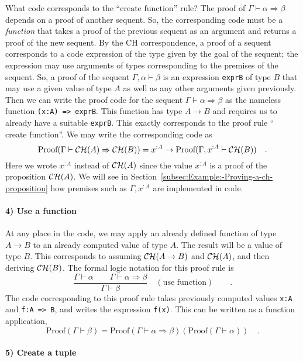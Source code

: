 What code corresponds to the ``$\text{create function}$'' rule?
The proof of $\Gamma\vdash\alpha\Rightarrow\beta$ depends on a proof
of another sequent. So, the corresponding code must be a \emph{function}
that takes a proof of the previous sequent as an argument and returns
a proof of the new sequent. By the CH correspondence, a proof of a
sequent corresponds to a code expression of the type given by the
goal of the sequent; the expression may use arguments of types corresponding
to the premises of the sequent. So, a proof of the sequent $\Gamma,\alpha\vdash\beta$
is an expression \lstinline!exprB! of type $B$ that may use a given
value of type $A$ as well as any other arguments given previously.
Then we can write the proof code for the sequent $\Gamma\vdash\alpha\Rightarrow\beta$
as the nameless function \lstinline!(x:A) => exprB!. This function
has type $A\rightarrow B$ and requires us to already have a suitable
\lstinline!exprB!. This exactly corresponds to the proof rule ``$\text{create function}$''.
We may write the corresponding code as
\[
\text{Proof}(\Gamma\vdash{\cal CH}(A)\Rightarrow{\cal CH}(B))=x^{:A}\rightarrow\text{Proof}(\Gamma,x^{:A}\vdash{\cal CH}(B))\quad.
\]
Here we wrote $x^{:A}$ instead of ${\cal CH}(A)$ since the value
$x^{:A}$ is a proof of the proposition ${\cal CH}(A)$. We will see
in Section~\ref{subsec:Example:-Proving-a-ch-proposition} how premises
such as $\Gamma,x^{:A}$ are implemented in code.

\paragraph{4) Use a function}

At any place in the code, we may apply an already defined function
of type $A\rightarrow B$ to an already computed value of type $A$.
The result will be a value of type $B$. This corresponds to assuming
${\cal CH}(A\rightarrow B)$ and ${\cal CH}(A)$, and then deriving
${\cal CH}(B)$. The formal logic notation for this proof rule is
\[
\frac{\Gamma\vdash\alpha\quad\quad\Gamma\vdash\alpha\Rightarrow\beta}{\Gamma\vdash\beta}\quad(\text{use function})\quad\quad.
\]
The code corresponding to this proof rule takes previously computed
values \lstinline!x:A! and \lstinline!f:A => B!, and writes the
expression \lstinline!f(x)!. This can be written as a function application,
\[
\text{Proof}(\Gamma\vdash\beta)=\text{Proof}\left(\Gamma\vdash\alpha\Rightarrow\beta\right)(\text{Proof}(\Gamma\vdash\alpha))\quad.
\]


\paragraph{5) Create a tuple}

